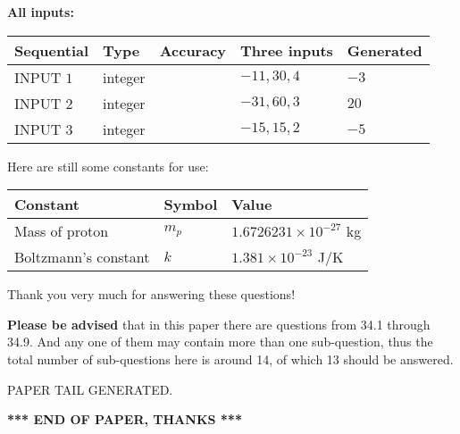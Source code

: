 \documentclass[12pt]{article}
\begin{document}
   
   
   
\noindent\vspace{0.1in}\hspace{-0.08in} {\textbf{\Large{All inputs: }}}
   
   
  
  
\noindent\begin{tabular}{|l|l|l|l|l|}
\hline
 Sequential & Type & Accuracy & Three inputs & Generated \\ 
\hline
 
 
  INPUT $            1 $ & integer &  & $
 -11
 , 
 30
 , 
 4
 $ & $ -3 $ 
 \\  \hline  
 
 
  INPUT $            2 $ & integer &  & $
 -31
 , 
 60
 , 
 3
 $ & $ 20 $ 
 \\  \hline  
 
 
  INPUT $            3 $ & integer &  & $
 -15
 , 
 15
 , 
 2
 $ & $ -5 $ 
 \\  \hline  
 \end{tabular}
   
   
   
   
   
   
 \vspace{0.2in}
Here are still some constants for use:
 
 
\noindent\begin{tabular}{|l|l|l|}
\hline
Constant & Symbol & Value \\
\hline
 
Mass of proton &
$m_p$ &
 $ 1.6726231 \times 10^{-27} $
kg \\
\hline
 
Boltzmann's constant &
$k$ &
 $ 1.381 \times 10^{-23} $
J/K \\
\hline
 
\end{tabular}
 
Thank you very much for answering these questions!
 
{\textbf{\large{Please be advised}}} that in this paper there are questions from
34.1 through
34.9.
And any one of them may contain more than one sub-question, thus the total number
of sub-questions here is around 14, of which
13 should be answered.
 
   
   
\vspace{2.0in} PAPER TAIL GENERATED.
   
   
   
   
\vspace{1.0in} 
{\textbf{\large{ *** END OF PAPER, THANKS *** }}} 
   
\end{document}
